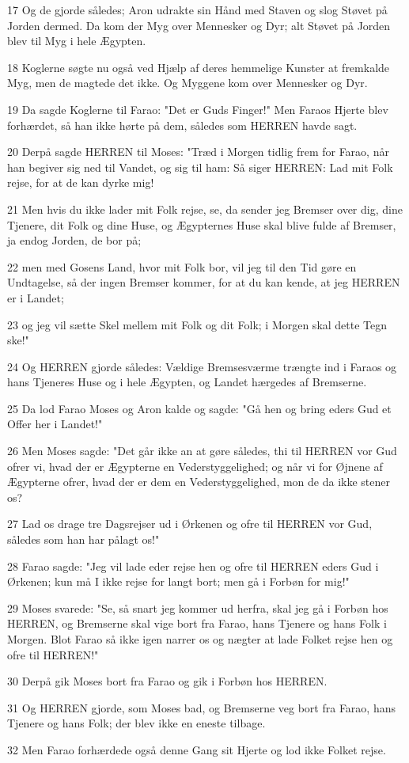 \par 17 Og de gjorde således; Aron udrakte sin Hånd med Staven og slog Støvet på Jorden dermed. Da kom der Myg over Mennesker og Dyr; alt Støvet på Jorden blev til Myg i hele Ægypten.
\par 18 Koglerne søgte nu også ved Hjælp af deres hemmelige Kunster at fremkalde Myg, men de magtede det ikke. Og Myggene kom over Mennesker og Dyr.
\par 19 Da sagde Koglerne til Farao: "Det er Guds Finger!" Men Faraos Hjerte blev forhærdet, så han ikke hørte på dem, således som HERREN havde sagt.
\par 20 Derpå sagde HERREN til Moses: "Træd i Morgen tidlig frem for Farao, når han begiver sig ned til Vandet, og sig til ham: Så siger HERREN: Lad mit Folk rejse, for at de kan dyrke mig!
\par 21 Men hvis du ikke lader mit Folk rejse, se, da sender jeg Bremser over dig, dine Tjenere, dit Folk og dine Huse, og Ægypternes Huse skal blive fulde af Bremser, ja endog Jorden, de bor på;
\par 22 men med Gosens Land, hvor mit Folk bor, vil jeg til den Tid gøre en Undtagelse, så der ingen Bremser kommer, for at du kan kende, at jeg HERREN er i Landet;
\par 23 og jeg vil sætte Skel mellem mit Folk og dit Folk; i Morgen skal dette Tegn ske!"
\par 24 Og HERREN gjorde således: Vældige Bremsesværme trængte ind i Faraos og hans Tjeneres Huse og i hele Ægypten, og Landet hærgedes af Bremserne.
\par 25 Da lod Farao Moses og Aron kalde og sagde: "Gå hen og bring eders Gud et Offer her i Landet!"
\par 26 Men Moses sagde: "Det går ikke an at gøre således, thi til HERREN vor Gud ofrer vi, hvad der er Ægypterne en Vederstyggelighed; og når vi for Øjnene af Ægypterne ofrer, hvad der er dem en Vederstyggelighed, mon de da ikke stener os?
\par 27 Lad os drage tre Dagsrejser ud i Ørkenen og ofre til HERREN vor Gud, således som han har pålagt os!"
\par 28 Farao sagde: "Jeg vil lade eder rejse hen og ofre til HERREN eders Gud i Ørkenen; kun må I ikke rejse for langt bort; men gå i Forbøn for mig!"
\par 29 Moses svarede: "Se, så snart jeg kommer ud herfra, skal jeg gå i Forbøn hos HERREN, og Bremserne skal vige bort fra Farao, hans Tjenere og hans Folk i Morgen. Blot Farao så ikke igen narrer os og nægter at lade Folket rejse hen og ofre til HERREN!"
\par 30 Derpå gik Moses bort fra Farao og gik i Forbøn hos HERREN.
\par 31 Og HERREN gjorde, som Moses bad, og Bremserne veg bort fra Farao, hans Tjenere og hans Folk; der blev ikke en eneste tilbage.
\par 32 Men Farao forhærdede også denne Gang sit Hjerte og lod ikke Folket rejse.

